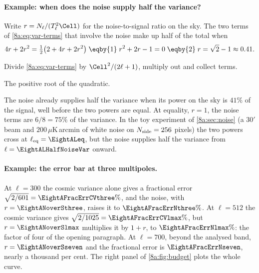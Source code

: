 \paragraph{Example: when does the noise supply half the variance?}
Write $r=N_\ell/(T_\ell^2\Cell)$ for the noise-to-signal ratio on the sky. The two terms of
\eqref{8a:eq:var-terms} that involve the noise make up half of the total when
\begin{align}
  4r+2r^2=\tfrac12\bigl(2+4r+2r^2\bigr)
  \;\eqby{1}\;r^2+2r-1=0
  \;\eqby{2}\;r=\sqrt2-1\approx0.41 .
  \nonumber
\end{align}
\begin{explain}
  \item Divide \eqref{8a:eq:var-terms} by $\Cell^2/(2\ell+1)$, multiply out and collect terms.
  \item The positive root of the quadratic.
\end{explain}
The noise already supplies half the variance when its power on the sky is $41\%$ of the
signal, well before the two powers are equal. At equality, $r=1$, the noise terms are
$6/8=75\%$ of the variance. In the toy experiment of \cref{8a:sec:noise} (a $30'$ beam and
$200\,\mu$K\,arcmin of white noise on $N_{\rm side}=256$ pixels) the two powers cross at
$\ell_{\rm eq}=\EightALeq$, but the noise supplies half the variance from
$\ell=\EightALHalfNoiseVar$ onward.

\paragraph{Example: the error bar at three multipoles.}
At $\ell=300$ the cosmic variance alone gives a fractional error
$\sqrt{2/601}=\EightAFracErrCVthree\%$, and the noise, with $r=\EightANoverSthree$, raises it
to $\EightAFracErrNthree\%$. At $\ell=512$ the cosmic variance gives
$\sqrt{2/1025}=\EightAFracErrCVlmax\%$, but $r=\EightANoverSlmax$ multiplies it by $1+r$, to
$\EightAFracErrNlmax\%$: the factor of four of the opening paragraph. At $\ell=700$, beyond
the analysed band, $r=\EightANoverSseven$ and the fractional error is $\EightAFracErrNseven$,
nearly a thousand per cent. The right panel of \cref{8a:fig:budget} plots the whole curve.

